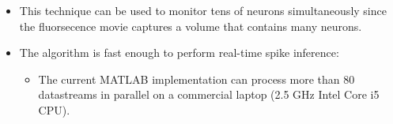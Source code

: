 \documentclass[8pt]{beamer}
\begin{document}
\begin{frame}
\begin{itemize}
\item<3-> This technique can be used to monitor tens of neurons simultaneously since the fluorsecence 
movie captures a volume that contains many neurons.\\[.3cm]

\item<4-> The algorithm is fast enough to perform real-time spike inference:
\begin{itemize}
\item The current MATLAB implementation can process more than 80 datastreams in parallel on a commercial 
laptop (2.5 GHz Intel Core i5 CPU).
\end{itemize}

\end{itemize}

\end{frame}

\section*{}

\begin{frame}
\begin{center}
\end{center}
\end{frame}
\end{document}
